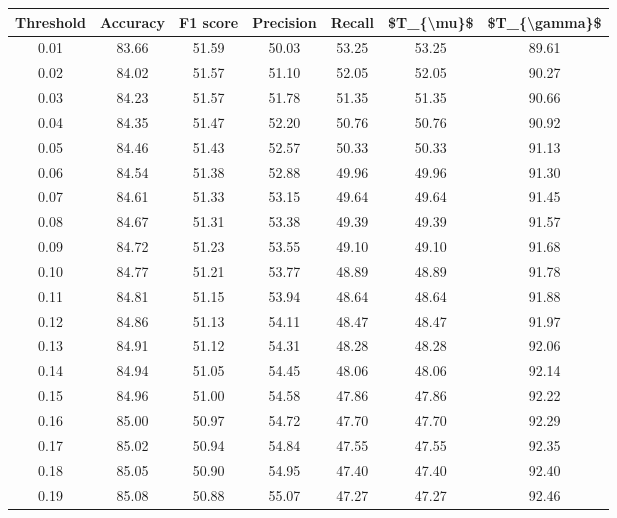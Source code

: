 \begin{tabular}{|c|c|c|c|c|c|c|}
\hline
 Threshold &  Accuracy &  F1 score &  Precision &  Recall &  \$T\_\{\textbackslash mu\}\$ &  \$T\_\{\textbackslash gamma\}\$ \\
\hline
      0.01 &     83.66 &     51.59 &      50.03 &   53.25 &      53.25 &         89.61 \\
      0.02 &     84.02 &     51.57 &      51.10 &   52.05 &      52.05 &         90.27 \\
      0.03 &     84.23 &     51.57 &      51.78 &   51.35 &      51.35 &         90.66 \\
      0.04 &     84.35 &     51.47 &      52.20 &   50.76 &      50.76 &         90.92 \\
      0.05 &     84.46 &     51.43 &      52.57 &   50.33 &      50.33 &         91.13 \\
      0.06 &     84.54 &     51.38 &      52.88 &   49.96 &      49.96 &         91.30 \\
      0.07 &     84.61 &     51.33 &      53.15 &   49.64 &      49.64 &         91.45 \\
      0.08 &     84.67 &     51.31 &      53.38 &   49.39 &      49.39 &         91.57 \\
      0.09 &     84.72 &     51.23 &      53.55 &   49.10 &      49.10 &         91.68 \\
      0.10 &     84.77 &     51.21 &      53.77 &   48.89 &      48.89 &         91.78 \\
      0.11 &     84.81 &     51.15 &      53.94 &   48.64 &      48.64 &         91.88 \\
      0.12 &     84.86 &     51.13 &      54.11 &   48.47 &      48.47 &         91.97 \\
      0.13 &     84.91 &     51.12 &      54.31 &   48.28 &      48.28 &         92.06 \\
      0.14 &     84.94 &     51.05 &      54.45 &   48.06 &      48.06 &         92.14 \\
      0.15 &     84.96 &     51.00 &      54.58 &   47.86 &      47.86 &         92.22 \\
      0.16 &     85.00 &     50.97 &      54.72 &   47.70 &      47.70 &         92.29 \\
      0.17 &     85.02 &     50.94 &      54.84 &   47.55 &      47.55 &         92.35 \\
      0.18 &     85.05 &     50.90 &      54.95 &   47.40 &      47.40 &         92.40 \\
      0.19 &     85.08 &     50.88 &      55.07 &   47.27 &      47.27 &         92.46 \\

\end{tabular}
